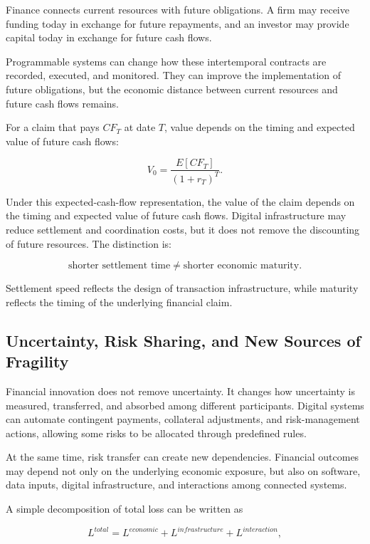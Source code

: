 Finance connects current resources with future obligations. A firm may receive funding today in exchange for future repayments, and an investor may provide capital today in exchange for future cash flows.

Programmable systems can change how these intertemporal contracts are recorded, executed, and monitored. They can improve the implementation of future obligations, but the economic distance between current resources and future cash flows remains.

For a claim that pays \(CF_T\) at date \(T\), value depends on the timing and expected value of future cash flows:

\begin{equation}
V_0=
\frac{E[CF_T]}{(1+r_T)^T}.
\label{eq:ch24-time-remains}
\end{equation}

Under this expected-cash-flow representation, the value of the claim depends on the timing and expected value of future cash flows. Digital infrastructure may reduce settlement and coordination costs, but it does not remove the discounting of future resources. The distinction is:

$$
\text{shorter settlement time}
\neq
\text{shorter economic maturity}.
$$

Settlement speed reflects the design of transaction infrastructure, while maturity reflects the timing of the underlying financial claim.


\subsection{Uncertainty, Risk Sharing, and New Sources of Fragility}

Financial innovation does not remove uncertainty. It changes how uncertainty is measured, transferred, and absorbed among different participants. Digital systems can automate contingent payments, collateral adjustments, and risk-management actions, allowing some risks to be allocated through predefined rules.

At the same time, risk transfer can create new dependencies. Financial outcomes may depend not only on the underlying economic exposure, but also on software, data inputs, digital infrastructure, and interactions among connected systems.

A simple decomposition of total loss can be written as

\begin{equation}
L^{total}
=
L^{economic}
+
L^{infrastructure}
+
L^{interaction},
\label{eq:ch24-new-fragility-loss}
\end{equation}


